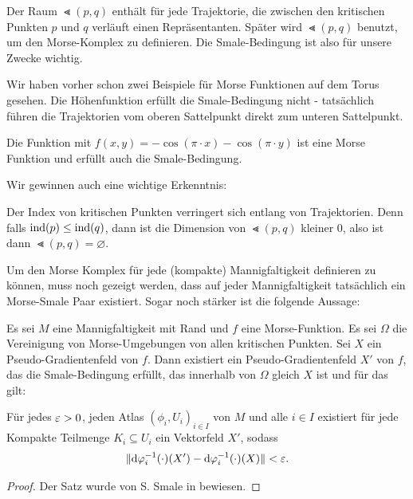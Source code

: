 Der Raum $\Lt (p, q)$ enthält für jede Trajektorie, die zwischen den kritischen Punkten $p$ und $q$ 
verläuft einen Repräsentanten. Später wird $\Lt (p, q)$ benutzt, um den Morse-Komplex zu definieren.
Die Smale-Bedingung ist also für unsere Zwecke wichtig.

\begin{example}
    Wir haben vorher schon zwei Beispiele für Morse Funktionen auf dem Torus gesehen. 
    Die Höhenfunktion erfüllt die Smale-Bedingung nicht - tatsächlich führen die Trajektorien 
    vom oberen Sattelpunkt direkt zum unteren Sattelpunkt.

    Die Funktion mit $f(x, y) = - \cos(\pi \cdot x) - \cos(\pi \cdot y)$ ist eine Morse 
    Funktion und erfüllt auch die Smale-Bedingung.
\end{example}

Wir gewinnen auch eine wichtige Erkenntnis: 

\begin{corollary}
    Der Index von kritischen Punkten verringert sich entlang von Trajektorien. Denn falls 
    ${ \operatorname{ind} } (p) \leq { \operatorname{ind} } (q)$, dann ist die Dimension von $\Lt (p, q)$
    kleiner $0$, also ist dann $\Lt (p, q) = \varnothing$.
\end{corollary}

Um den Morse Komplex für jede (kompakte) Mannigfaltigkeit definieren zu können, muss noch gezeigt
werden, dass auf jeder Mannigfaltigkeit tatsächlich ein Morse-Smale Paar existiert. 
Sogar noch stärker ist die folgende Aussage:

\begin{theorem}
    Es sei $M$ eine Mannigfaltigkeit mit Rand und $f$ eine Morse-Funktion. Es sei $\Omega$ die 
    Vereinigung von Morse-Umgebungen von allen kritischen Punkten. Sei $X$ ein Pseudo-Gradientenfeld 
    von $f$. Dann existiert ein Pseudo-Gradientenfeld $X'$ von $f$, das die Smale-Bedingung erfüllt, 
    das innerhalb von $\Omega$ gleich $X$ ist und für das gilt:

    Für jedes $\varepsilon > 0$, jeden Atlas $(\phi_i, U_i)_{i \in I}$ von $M$ und alle $i \in I$ existiert 
    für jede Kompakte Teilmenge $K_i \subseteq U_i$ ein Vektorfeld $X'$, sodass 
    \[ \| { \operatorname{d} } \varphi_i^{-1} (\cdot) (X') - { \operatorname{d} } \varphi_i^{-1} (\cdot) (X) \| < \varepsilon . \]
\end{theorem}

\begin{proof}
    Der Satz wurde von S. Smale in \cite{smale1} bewiesen.
\end{proof}